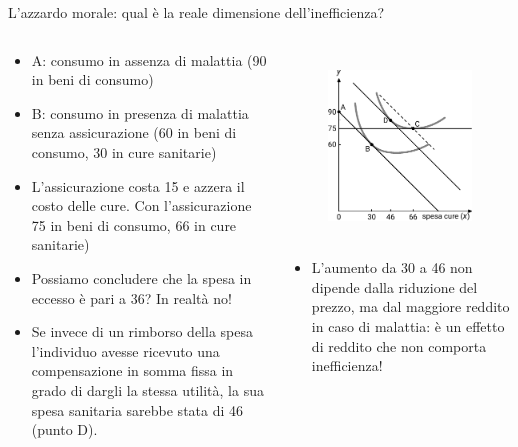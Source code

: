 \documentclass[aspectratio=149,11pt]{beamer}
\begin{document}
\begin{frame}{L'azzardo morale: qual è la reale dimensione dell'inefficienza?}
\begin{columns}
\begin{column}{.5\columnwidth}
\small
\begin{itemize}
\item A: consumo in assenza di malattia (90 in beni di consumo)
\item B: consumo in presenza di malattia senza assicurazione (60 in beni di
consumo, 30 in cure sanitarie)
\item L'assicurazione costa 15 e azzera il costo delle cure. Con l'assicurazione
75 in beni di consumo, 66 in cure sanitarie)
\item Possiamo concludere che la spesa in eccesso è pari a 36? In realtà no!
\item Se invece di un rimborso della spesa l'individuo avesse ricevuto una
compensazione in somma fissa in grado di dargli la stessa utilità, la sua
spesa sanitaria sarebbe stata di 46 (punto D).
\end{itemize}
\end{column}

\begin{column}{.5\columnwidth}
\begin{figure}[htbp]
\centering
\includegraphics[height=5cm]{./figure/moral-hazard-effetto-reddito.pdf}
\end{figure}    
\small
\begin{itemize}
\item L'aumento da 30 a 46 non dipende dalla riduzione del prezzo, ma dal
maggiore reddito in caso di malattia: è un effetto di reddito che non comporta inefficienza!
\end{itemize}
\end{column}
\end{columns}
\end{frame}
\end{document}
